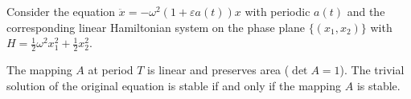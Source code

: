 Consider the equation $\ddot{x} = -\omega^2(1 + \varepsilon a(t))x$ with periodic $a(t)$ and the corresponding linear Hamiltonian system on the phase plane $\{(x_1, x_2)\}$ with $H = \frac{1}{2}\omega^2 x_1^2 + \frac{1}{2}x_2^2$.

The mapping $A$ at period $T$ is linear and preserves area ($\det A = 1$). The trivial solution of the original equation is stable if and only if the mapping $A$ is stable.
